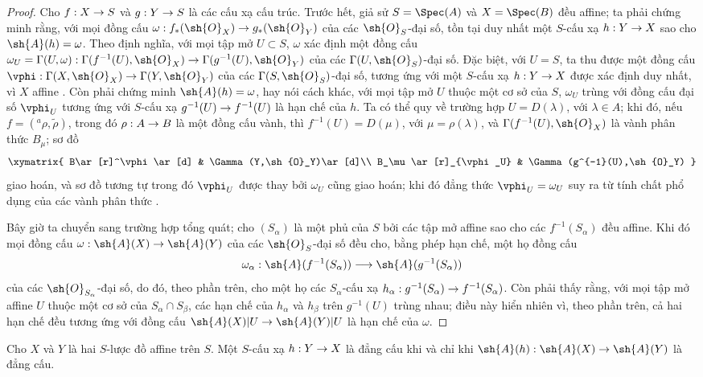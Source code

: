 \documentclass[oneside,10pt]{amsart}
\makeatletter
\newcommand{\ega@arrow}[2]{\mathchoice{#1}{#2}{#2}{#2}}
\renewcommand{\to}{\ega@arrow{\longrightarrow}{\rightarrow}}
\newcommand{\oldpage}[2][]{\marginnote{\normalfont\footnotesize\textbf{#1}~|~#2}\ignorespaces}
\let\EGAOriginalLabel\label
\renewcommand{\label}[1]{\phantomsection\EGAOriginalLabel{#1}}
\makeatother
\begin{document}
\begin{proof}
Cho $f:X\to S$ và $g:Y\to S$ là các cấu xạ cấu trúc.
Trước hết, giả sử $S=\Spec(A)$ và $X=\Spec(B)$ đều affine; ta phải chứng minh rằng, với mọi đồng cấu $\omega:f_*(\sh{O}_X)\to g_*(\sh{O}_Y)$ của các $\sh{O}_S$-đại số, tồn tại duy nhất một $S$-cấu xạ $h:Y\to X$ sao cho $\sh{A}(h)=\omega$.
Theo định nghĩa, với mọi tập mở $U\subset S$, $\omega$ xác định một đồng cấu $\omega_U=\Gamma(U,\omega):\Gamma(f^{-1}(U),\sh{O}_X)\to\Gamma(g^{-1}(U),\sh{O}_Y)$ của các $\Gamma(U,\sh{O}_S)$-đại số.
Đặc biệt, với $U=S$, ta thu được một đồng cấu $\vphi:\Gamma(X,\sh{O}_X)\to\Gamma(Y,\sh{O}_Y)$ của các $\Gamma(S,\sh{O}_S)$-đại số, tương ứng với một $S$-cấu xạ $h:Y\to X$ được xác định duy nhất, vì $X$ affine .
Còn phải chứng minh $\sh{A}(h)=\omega$, hay nói cách khác, với mọi tập mở $U$ thuộc một cơ sở của $S$, $\omega_U$ trùng với đồng cấu đại số $\vphi_U$ tương ứng với $S$-cấu xạ $g^{-1}(U)\to f^{-1}(U)$ là hạn chế của $h$.
Ta có thể quy về trường hợp $U=D(\lambda)$, với $\lambda\in A$; khi đó, nếu $f=({}^a\rho,\widetilde{\rho})$, trong đó $\rho:A\to B$ là một đồng cấu vành, thì $f^{-1}(U)=D(\mu)$, với $\mu=\rho(\lambda)$, và $\Gamma(f^{-1}(U),\sh{O}_X)$ là vành phân thức $B_\mu$; sơ đồ
\[
  \xymatrix{
    B\ar[r]^\vphi\ar[d] &
    \Gamma(Y,\sh{O}_Y)\ar[d]\\
    B_\mu\ar[r]_{\vphi_U} &
    \Gamma(g^{-1}(U),\sh{O}_Y)
  }
\]
giao hoán, và sơ đồ tương tự trong đó $\vphi_U$ được thay bởi $\omega_U$ cũng giao hoán; khi đó đẳng thức $\vphi_U=\omega_U$ suy ra từ tính chất phổ dụng của các vành phân thức .

Bây giờ ta chuyển sang trường hợp tổng quát; cho $(S_\alpha)$ là một phủ của $S$ bởi các tập mở affine
\oldpage[II]{8}
sao cho các $f^{-1}(S_\alpha)$ đều affine.
Khi đó mọi đồng cấu $\omega:\sh{A}(X)\to\sh{A}(Y)$ của các $\sh{O}_S$-đại số đều cho, bằng phép hạn chế, một họ đồng cấu
\[
  \omega_\alpha:\sh{A}(f^{-1}(S_\alpha))\to\sh{A}(g^{-1}(S_\alpha))
\]
của các $\sh{O}_{S_\alpha}$-đại số, do đó, theo phần trên, cho một họ các $S_\alpha$-cấu xạ $h_\alpha:g^{-1}(S_\alpha)\to f^{-1}(S_\alpha)$.
Còn phải thấy rằng, với mọi tập mở affine $U$ thuộc một cơ sở của $S_\alpha\cap S_\beta$, các hạn chế của $h_\alpha$ và $h_\beta$ trên $g^{-1}(U)$ trùng nhau; điều này hiển nhiên vì, theo phần trên, cả hai hạn chế đều tương ứng với đồng cấu $\sh{A}(X)|U\to\sh{A}(Y)|U$ là hạn chế của $\omega$.
\end{proof}

\begin{corollary}[1.2.8]
\label{II.1.2.8}
Cho $X$ và $Y$ là hai $S$-lược đồ affine trên $S$.
Một $S$-cấu xạ $h:Y\to X$ là đẳng cấu khi và chỉ khi $\sh{A}(h):\sh{A}(X)\to\sh{A}(Y)$ là đẳng cấu.
\end{corollary}
\end{document}
